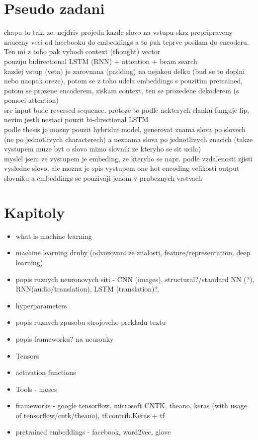 \section{Pseudo zadani}

chapu to tak, ze: nejdriv projedu kazde slovo na vstupu skrz prepripraveny nauceny veci od facebooku do embeddings a to pak teprve posilam do encoderu. Ten mi z toho pak vyhodi context (thought) vector\\
pouziju bidirectional LSTM (RNN) + attention + beam search\\
kazdej vstup (veta) je zarovnana (padding) na nejakou delku (bud se to doplni nebo naopak oreze), potom se z toho udela embeddings s pouzitim pretrained, potom se prozene encoderem, ziskam context, ten se prozedene dekoderem (s pomoci attention)\\
src input bude reversed sequence, protoze to podle nekterych clanku funguje lip, nevim jestli nestaci pouzit bi-directional LSTM\\

podle thesis je mozny pouzit hybridni model, generovat znama slova po slovech (ne po jednotlivych characterech) a neznama slova po jednotlivych znacich (takze vystupem muze byt o slovo mimo slovnik ze kteryho se sit ucila)\\

myslel jsem ze vystupem je embeding, ze kteryho se napr. podle vzdalenosti zjisti vysledne slovo, ale mozna je spis vystupem one hot encoding velikosti output slovniku a embeddings se pouzivaji jenom v prubeznych vrstvach

\section{Kapitoly}
\begin{itemize}
  \item what is machine learning
  \item machine learning druhy (odvozovani ze znalosti, feature/representation, deep learning)
  \item popis ruznych neuronovych siti - CNN (images), structural?/standard NN (?), RNN(audio/translation), LSTM (translation)?,
  \item hyperparameters
  \item popis ruznych zpusobu strojoveho prekladu textu
  \item popis frameworku? na neuronky
  \item Tensors
  \item activation functions
  \item Tools - moses
  \item frameworks - google tensorflow, microsoft CNTK, theano, keras (with usage of tensorflow/cntk/theano), tf.contrib.Keras + tf
  \item pretrained embeddings - facebook, word2vec, glove
\end{itemize}


